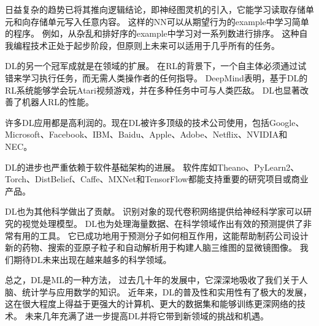 
日益复杂的趋势已将其推向逻辑结论，即神经图灵机\citep{Graves-et-al-arxiv2014}的引入，它能学习读取存储单元和向存储单元写入任意内容。
这样的\gls{NN}可以从期望行为的\gls{example}中学习简单的程序。
例如，从杂乱和排好序的\gls{example}中学习对一系列数进行排序。
这种自我编程技术正处于起步阶段，但原则上未来可以适用于几乎所有的任务。


\gls{DL}的另一个冠军成就是在领域的扩展。
在\gls{RL}的背景下，一个自主体必须通过试错来学习执行任务，而无需人类操作者的任何指导。
DeepMind表明，基于\gls{DL}的\gls{RL}系统能够学会玩Atari视频游戏，并在多种任务中可与人类匹敌\citep{Mnih-et-al-2015}。
\gls{DL}也显著改善了机器人\gls{RL}的性能\citep{finn2015learning}。

许多\gls{DL}应用都是高利润的。现在\gls{DL}被许多顶级的技术公司使用，包括Google、Microsoft、Facebook、IBM、Baidu、Apple、Adobe、Netflix、NVIDIA和NEC。

\gls{DL}的进步也严重依赖于软件基础架构的进展。
软件库如Theano\citep{bergstra+al:2010-scipy,Bastien-2012}、PyLearn2\citep{pylearn2_arxiv_2013}、Torch\citep{Torch-2011}、DistBelief\citep{Dean-et-al-NIPS2012}、Caffe\citep{Jia13caffe}、MXNet\citep{chen2015mxnet}和TensorFlow\citep{tensorflow}都能支持重要的研究项目或商业产品。

\gls{DL}也为其他科学做出了贡献。
识别对象的现代卷积网络提供给神经科学家可以研究的视觉处理模型\citep{dicarlo-tutorial-2013}。
\gls{DL}也为处理海量数据、在科学领域作出有效的预测提供了非常有用的工具。
它已成功地用于预测分子如何相互作用，这能帮助制药公司设计新的药物\citep{Dahl-et-al-arxiv2014}、搜索的亚原子粒子\citep{baldi2014searching}和自动解析用于构建人脑三维图的显微镜图像\citep{knowlesdeep}。
我们期待\gls{DL}未来出现在越来越多的科学领域。


总之，\gls{DL}是\gls{ML}的一种方法， 过去几十年的发展中，它深深地吸收了我们关于人脑、统计学与应用数学的知识。
近年来，\gls{DL}的普及性和实用性有了极大的发展，这在很大程度上得益于更强大的计算机、更大的数据集和能够训练更深网络的技术。
未来几年充满了进一步提高\gls{DL}并将它带到新领域的挑战和机遇。


